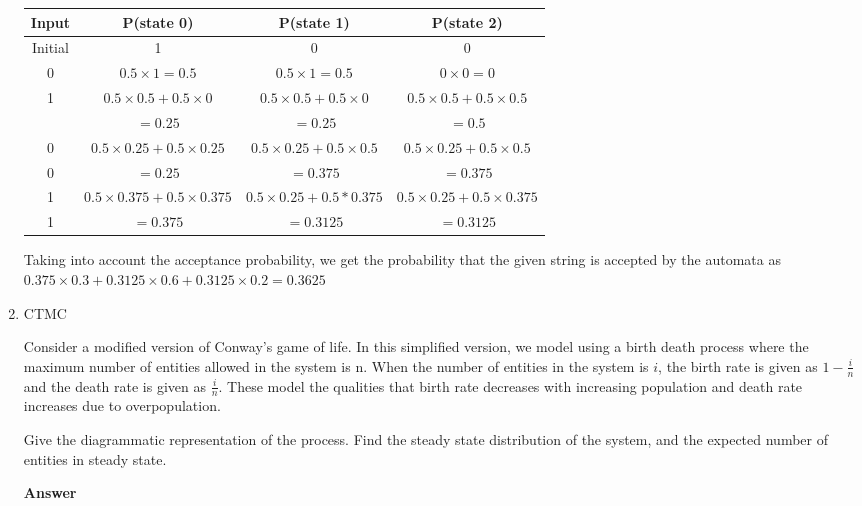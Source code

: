\documentclass[12pt, oneside]{article}
\begin{document}
\begin{enumerate}
{    \begin{center}\begin{tabular}{| c | c | c | c |}
        \hline
        Input & P(state 0) & P(state 1) & P(state 2) \\
        \hline
        Initial & 1 & 0 & 0 \\
        \hline
        0 & \(0.5 \times 1 = 0.5\) & \(0.5 \times 1 = 0.5\) & \(0 \times 0 = 0\) \\
        \hline
        1 & \(0.5 \times 0.5 + 0.5 \times 0 \) & \(0.5 \times 0.5 + 0.5 \times 0\) & \(0.5 \times 0.5 + 0.5 \times 0.5\) \\
          & \(= 0.25\) & \(= 0.25\) & \(= 0.5\) \\
        \hline
        0 & \(0.5 \times 0.25 + 0.5 \times 0.25\) & \(0.5 \times 0.25 + 0.5 \times 0.5\) & \(0.5 \times 0.25 + 0.5 \times 0.5\) \\
        0 & \(= 0.25\) & \(= 0.375\) & \(= 0.375\) \\
        \hline
        1 & \(0.5 \times 0.375 + 0.5 \times 0.375\) & \(0.5 \times 0.25 + 0.5 * 0.375\) & \(0.5 \times 0.25 + 0.5 \times 0.375\) \\
        1 & \(= 0.375\) & \(= 0.3125\) & \(= 0.3125\) \\
        \hline
    \end{tabular}\end{center}

    Taking into account the acceptance probability, we get the probability that the given
    string is accepted by the automata as 
    \(0.375 \times 0.3 + 0.3125 \times 0.6 + 0.3125 \times 0.2 = 0.3625\)
}

\item {
    CTMC

    Consider a  modified version of Conway's game of life. In this simplified version,
    we model using a birth death process where the maximum number of entities allowed in
    the system is n. When the number of entities in the system is \(i\), the birth rate is
    given as \(1 - \frac{i}{n}\) and the death rate is given as \(\frac{i}{n}\). These
    model the qualities that birth rate decreases with increasing population and death
    rate increases due to overpopulation.

    Give the diagrammatic representation of the process. Find the steady state distribution
    of the system, and the expected number of entities in steady state.

    \textbf{Answer}

}
\end{enumerate}
\end{document}
